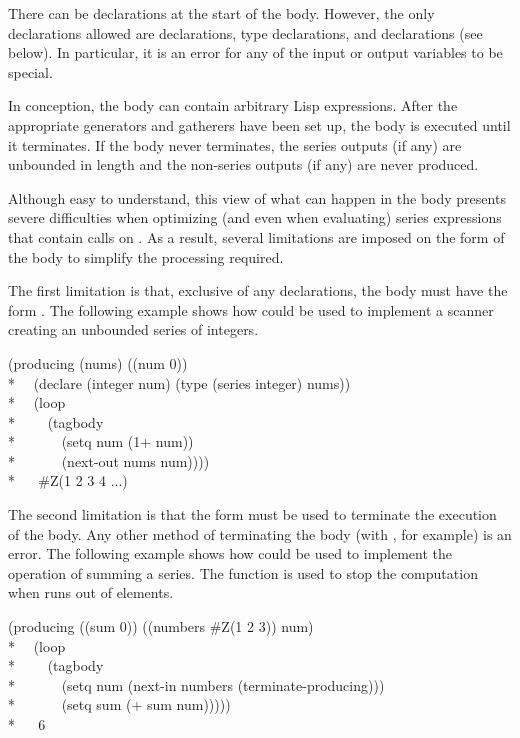 \begin{defmac}
There can be declarations at the start of the body.  However,
the only declarations allowed are  declarations, type
declarations, and  declarations (see
below).  In particular, it is an error for any of the input or output
variables to be special.

In conception, the body can contain arbitrary Lisp expressions.
After the appropriate generators and gatherers have been set up, the
body is executed until it terminates.  If the body never
terminates, the series outputs (if any) are unbounded in length and
the non-series outputs (if any) are never produced.

Although easy to understand, this view of what can happen in the
body presents severe difficulties when optimizing (and even when
evaluating) series expressions that contain calls on .
As a result, several limitations are imposed on the form of the
body to simplify the processing required.

The first limitation is that, exclusive of any declarations, the
body must have the form .  The following
example shows how  could be used to implement a
scanner creating an unbounded series of integers.
\begin{lisp}
(producing (nums) ((num 0)) \\*
~~(declare (integer num) (type (series integer) nums)) \\*
~~(loop \\*
~~~~(tagbody \\*
~~~~~~(setq num (1+ num)) \\*
~~~~~~(next-out nums num)))) \\*
~~{\EV} \#Z(1 2 3 4 ...)
\end{lisp}

The second limitation is that the form  must be
used to terminate the execution of the body.  Any other method of
terminating the body (with , for example) is an error.
The following example shows how  could be used to
implement the operation of summing a series.  The function 
 is used to stop the computation when 
runs out of elements.
\begin{lisp}
(producing ((sum 0)) ((numbers \#Z(1 2 3)) num) \\* 
~~(loop \\*
~~~~(tagbody \\*
~~~~~~(setq num (next-in numbers (terminate-producing))) \\*
~~~~~~(setq sum (+ sum num))))) \\*
~~{\EV} 6
\end{lisp}


\end{defmac}
